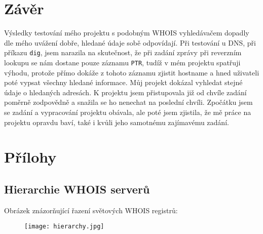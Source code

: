 \documentclass[a4paper, 11pt]{article}
\begin{document}
\section{Závěr}
Výsledky testování mého projektu s podobným WHOIS vyhledávačem dopadly dle mého uvážení dobře, hledané údaje sobě odpovídají. Při testování u DNS, při příkazu \verb|dig|, jsem narazila na skutečnost, že při zadání zprávy při reverzním lookupu se nám dostane pouze záznamu \verb|PTR|, tudíž v mém projektu spatřuji výhodu, protože přímo dokáže z tohoto záznamu zjistit hostname a hned uživateli poté vypsat všechny hledané informace.  Můj projekt dokázal vyhledat stejné údaje o hledaných adresách. K projektu jsem přistupovala již od chvíle zadání poměrně zodpovědně a snažila se ho nenechat na poslední chvíli. Zpočátku jsem se zadání a vypracování projektu obávala, ale poté jsem zjistila, že mě práce na projektu opravdu baví, také i kvůli jeho samotnému zajímavému zadání.

 \newpage
\section{Přílohy}
\subsection{Hierarchie WHOIS serverů}
Obrázek znázorňující řazení světových WHOIS registrů\cite{hierWhois:web}:
\begin{figure}[!htb]
  \texttt{[image: hierarchy.jpg]}
\end{figure}
 \newpage

\end{document}
